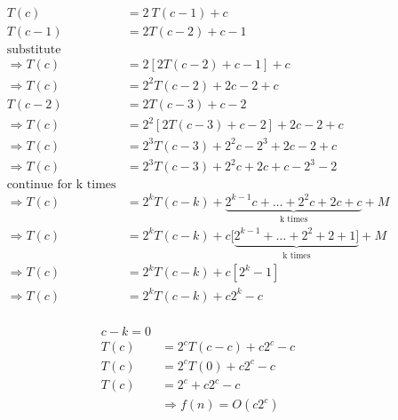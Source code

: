 \documentclass[12pt]{article}
\begin{document}
\begin{latin}
\begin{align*}
T(c) &= 2 \: T(c-1) + c \\
T(c-1) &= 2 T(c-2) + c - 1 \\
\text{substitute}& \\
\Rightarrow T(c) &= 2 [ 2 T(c-2) + c - 1 ] + c \\
\Rightarrow T(c) &= 2^{2} T(c-2) + 2c - 2 + c \\
T(c-2) &= 2 T(c-3) + c - 2 \\
\Rightarrow T(c) &= 2^{2} [ 2 T(c-3) + c - 2 ] +  2c - 2 + c \\
\Rightarrow T(c) &= 2^{3} T(c-3) + 2^{2}c - 2^{3} + 2c - 2 + c \\
\Rightarrow T(c) &= 2^{3} T(c-3) + 2^{2}c + 2c + c - 2^{3}  - 2  \\
\text{continue for k times}& \\
\Rightarrow T(c) &= 2^{k} T(c-k) + \underbrace{2^{k-1}c +  \dots + 2^{2}c + 2c + c}_{\text{k times}}  + M \\
\Rightarrow T(c) &= 2^{k} T(c-k) + c[\underbrace{2^{k-1} +  \dots + 2^{2} + 2 + 1]}_{\text{k times}}  + M \\
\Rightarrow T(c) &= 2^{k} T(c-k) + c[2^{k} - 1] \\
\Rightarrow T(c) &= 2^{k} T(c-k) + c2^{k} - c \\
\end{align*}
\end{latin}


\begin{latin}
\begin{align*}
c - k = 0& \\
T(c) &= 2^{c} T(c-c) + c2^{c} - c \\
T(c) &= 2^{c} T(0) + c2^{c} - c \\
T(c) &= 2^{c} + c2^{c} - c \\
&\Rightarrow f(n) = O(c2^{c})
\end{align*}
\end{latin}
\end{document}
